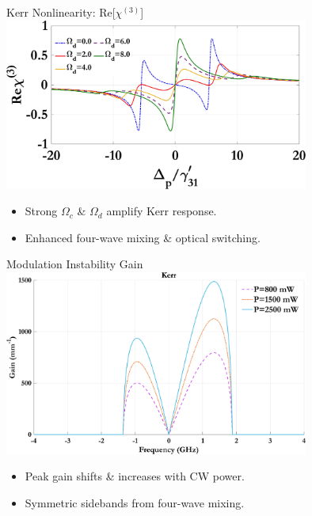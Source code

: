 \documentclass{beamer}
\begin{document}
\begin{frame}{Kerr Nonlinearity: Re[$\chi^{(3)}$]}
  \vspace{-17pt}
  \hspace*{27pt}
  \includegraphics[width=0.75\textwidth]{Assets/Real_chi3_Omega_d.jpeg}
  \begin{itemize}
    \item Strong $\Omega_c$ \& $\Omega_d$ amplify Kerr response.
    \item Enhanced four-wave mixing \& optical switching.
  \end{itemize}
\end{frame}

\begin{frame}{Modulation Instability Gain}
  \hspace*{30pt}
  \includegraphics[width=0.75\textwidth]{Assets/G_v_Power.jpeg}
  \begin{itemize}
    \item Peak gain shifts \& increases with CW power.
    \item Symmetric sidebands from four-wave mixing.
  \end{itemize}
\end{frame}
\end{document}
